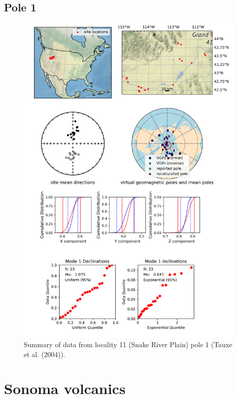 \subsection{Pole 1}


\begin{figure}[H]
\centering
\includegraphics[width=5 in]{./11/1/pole_summary.png}
\caption{Summary of data from locality 11 (Snake River Plain) pole 1 (Tauxe et al. (2004)).}
\end{figure}

\section{Sonoma volcanics}
